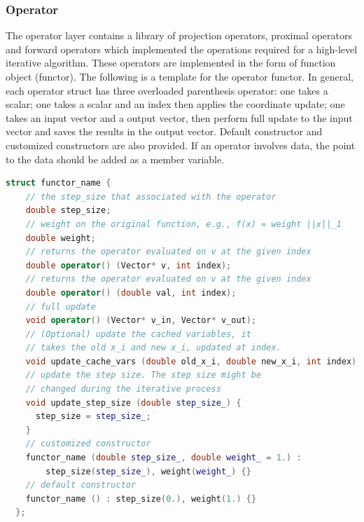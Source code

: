 \subsubsection{Operator}
The operator layer contains a library of projection operators, proximal operators and forward operators which implemented the operations required for a high-level iterative algorithm. These operators are implemented in the form of function object (functor). The following is a template for the operator functor. In general, each operator struct has three overloaded parenthesis operator: one takes a scalar; one takes a scalar and an index then applies the coordinate update; one takes an input vector and a output vector, then perform full update to the input vector and saves the results in the output vector. Default constructor and customized constructors are also provided. If an operator involves data, the point to the data should be added as a member variable. 

\begin{lstlisting}[language=c++]
  struct functor_name {
    // the step_size that associated with the operator  
    double step_size;
    // weight on the original function, e.g., f(x) = weight ||x||_1
    double weight;      
    // returns the operator evaluated on v at the given index
    double operator() (Vector* v, int index);
    // returns the operator evaluated on v at the given index
    double operator() (double val, int index);
    // full update
    void operator() (Vector* v_in, Vector* v_out);
    // (Optional) update the cached variables, it 
    // takes the old x_i and new x_i, updated at index.
    void update_cache_vars (double old_x_i, double new_x_i, int index);
    // update the step size. The step size might be
    // changed during the iterative process
    void update_step_size (double step_size_) {
      step_size = step_size_;
    }
    // customized constructor
    functor_name (double step_size_, double weight_ = 1.) :
        step_size(step_size_), weight(weight_) {}
    // default constructor
    functor_name () : step_size(0.), weight(1.) {}
  };
\end{lstlisting}

